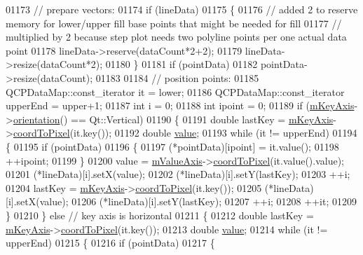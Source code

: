 \begin{DoxyCode}
01173   \textcolor{comment}{// prepare vectors:}
01174   \textcolor{keywordflow}{if} (lineData)
01175   \{
01176     \textcolor{comment}{// added 2 to reserve memory for lower/upper fill base points that might be needed for fill}
01177     \textcolor{comment}{// multiplied by 2 because step plot needs two polyline points per one actual data point}
01178     lineData->reserve(dataCount*2+2);
01179     lineData->resize(dataCount*2);
01180   \}
01181   \textcolor{keywordflow}{if} (pointData)
01182     pointData->resize(dataCount);
01183   
01184   \textcolor{comment}{// position points:}
01185   QCPDataMap::const\_iterator it = lower;
01186   QCPDataMap::const\_iterator upperEnd = upper+1;
01187   \textcolor{keywordtype}{int} i = 0;
01188   \textcolor{keywordtype}{int} ipoint = 0;
01189   \textcolor{keywordflow}{if} (\hyperlink{a00024_a692421b963472fa6e16156a74ba96832}{mKeyAxis}->\hyperlink{a00025_a57483f2f60145ddc9e63f3af53959265}{orientation}() == Qt::Vertical)
01190   \{
01191     \textcolor{keywordtype}{double} lastKey = \hyperlink{a00024_a692421b963472fa6e16156a74ba96832}{mKeyAxis}->\hyperlink{a00025_a985ae693b842fb0422b4390fe36d299a}{coordToPixel}(it.key());
01192     \textcolor{keywordtype}{double} \hyperlink{a00116_aee90379adb0307effb138f4871edbc5c}{value};
01193     \textcolor{keywordflow}{while} (it != upperEnd)
01194     \{
01195       \textcolor{keywordflow}{if} (pointData)
01196       \{
01197         (*pointData)[ipoint] = it.value();
01198         ++ipoint;
01199       \}
01200       value = \hyperlink{a00024_acfc46d619ab9598be33b64146da45822}{mValueAxis}->\hyperlink{a00025_a985ae693b842fb0422b4390fe36d299a}{coordToPixel}(it.value().value);
01201       (*lineData)[i].setX(value);
01202       (*lineData)[i].setY(lastKey);
01203       ++i;
01204       lastKey = \hyperlink{a00024_a692421b963472fa6e16156a74ba96832}{mKeyAxis}->\hyperlink{a00025_a985ae693b842fb0422b4390fe36d299a}{coordToPixel}(it.key());
01205       (*lineData)[i].setX(value);
01206       (*lineData)[i].setY(lastKey);
01207       ++i;
01208       ++it;
01209     \}
01210   \} \textcolor{keywordflow}{else} \textcolor{comment}{// key axis is horizontal}
01211   \{
01212     \textcolor{keywordtype}{double} lastKey = \hyperlink{a00024_a692421b963472fa6e16156a74ba96832}{mKeyAxis}->\hyperlink{a00025_a985ae693b842fb0422b4390fe36d299a}{coordToPixel}(it.key());
01213     \textcolor{keywordtype}{double} \hyperlink{a00116_aee90379adb0307effb138f4871edbc5c}{value};
01214     \textcolor{keywordflow}{while} (it != upperEnd)
01215     \{
01216       \textcolor{keywordflow}{if} (pointData)
01217       \{

\end{DoxyCode}
